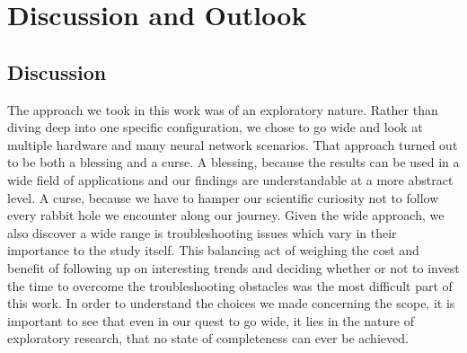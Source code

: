 \chapter{Discussion and Outlook}\label{chap:discussion}

\section{Discussion}

The approach we took in this work was of an exploratory nature. Rather than diving deep into one specific configuration, we chose to go wide and look at multiple hardware and many neural network scenarios. That approach turned out to be both a blessing and a curse. A blessing, because the results can be used in a wide field of applications and our findings are understandable at a more abstract level. A curse, because we have to hamper our scientific curiosity not to follow every rabbit hole we encounter along our journey. Given the wide approach, we also discover a wide range is troubleshooting issues which vary in their importance to the study itself. This balancing act of weighing the cost and benefit of following up on interesting trends and deciding whether or not to invest the time to overcome the troubleshooting obstacles was the most difficult part of this work. In order to understand the choices we made concerning the scope, it is important to see that even in our quest to go wide, it lies in the nature of exploratory research, that no state of completeness can ever be achieved.

